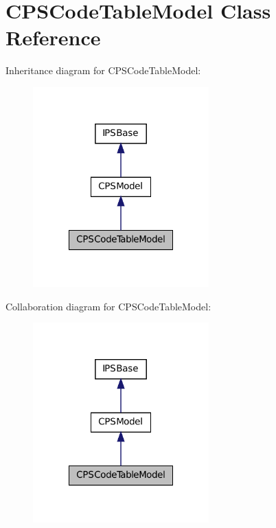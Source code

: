 \hypertarget{classCPSCodeTableModel}{
\section{CPSCodeTableModel Class Reference}
\label{classCPSCodeTableModel}
}


Inheritance diagram for CPSCodeTableModel:\nopagebreak
\begin{figure}[H]
\begin{center}
\leavevmode
\includegraphics[width=192pt]{classCPSCodeTableModel__inherit__graph}
\end{center}
\end{figure}


Collaboration diagram for CPSCodeTableModel:\nopagebreak
\begin{figure}[H]
\begin{center}
\leavevmode
\includegraphics[width=192pt]{classCPSCodeTableModel__coll__graph}
\end{center}
\end{figure}
